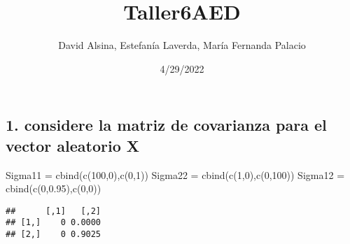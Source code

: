 \documentclass[
]{article}
\title{Taller6AED}
\author{David Alsina, Estefanía Laverda, María Fernanda Palacio}
\date{4/29/2022}
\newenvironment{Shaded}{\begin{snugshade}}{\end{snugshade}}
\newcommand{\CommentTok}[1]{\textcolor[rgb]{0.56,0.35,0.01}{\textit{#1}}}
\newcommand{\DecValTok}[1]{\textcolor[rgb]{0.00,0.00,0.81}{#1}}
\newcommand{\FloatTok}[1]{\textcolor[rgb]{0.00,0.00,0.81}{#1}}
\newcommand{\FunctionTok}[1]{\textcolor[rgb]{0.00,0.00,0.00}{#1}}
\newcommand{\NormalTok}[1]{#1}
\newcommand{\OtherTok}[1]{\textcolor[rgb]{0.56,0.35,0.01}{#1}}
\newcommand{\SpecialCharTok}[1]{\textcolor[rgb]{0.00,0.00,0.00}{#1}}
\begin{document}
\maketitle

\hypertarget{considere-la-matriz-de-covarianza-para-el-vector-aleatorio-x}{%
\subsection{1. considere la matriz de covarianza para el vector
aleatorio
X}\label{considere-la-matriz-de-covarianza-para-el-vector-aleatorio-x}}

\begin{Shaded}
\begin{Highlighting}[]
\NormalTok{Sigma11 }\OtherTok{=} \FunctionTok{cbind}\NormalTok{(}\FunctionTok{c}\NormalTok{(}\DecValTok{100}\NormalTok{,}\DecValTok{0}\NormalTok{),}\FunctionTok{c}\NormalTok{(}\DecValTok{0}\NormalTok{,}\DecValTok{1}\NormalTok{))}
\NormalTok{Sigma22 }\OtherTok{=} \FunctionTok{cbind}\NormalTok{(}\FunctionTok{c}\NormalTok{(}\DecValTok{1}\NormalTok{,}\DecValTok{0}\NormalTok{),}\FunctionTok{c}\NormalTok{(}\DecValTok{0}\NormalTok{,}\DecValTok{100}\NormalTok{))}
\NormalTok{Sigma12 }\OtherTok{=} \FunctionTok{cbind}\NormalTok{(}\FunctionTok{c}\NormalTok{(}\DecValTok{0}\NormalTok{,}\FloatTok{0.95}\NormalTok{),}\FunctionTok{c}\NormalTok{(}\DecValTok{0}\NormalTok{,}\DecValTok{0}\NormalTok{))}
\end{Highlighting}
\end{Shaded}

\begin{Shaded}
\end{Shaded}

\begin{verbatim}
##      [,1]   [,2]
## [1,]    0 0.0000
## [2,]    0 0.9025
\end{verbatim}
\end{document}
